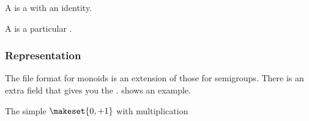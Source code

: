 
A \Monoid is a \Semigroup with an identity.


A \FiniteMonoid is a particular \FiniteSemigroup.


\subsubsection*{Representation}

The file format for monoids is an extension of those for semigroups.
There is an extra field  that gives you the .
 shows an example.

\begin{marginfigure}%
    \caption{The simple  $\makeset{0,+1}$ with multiplication}%
    \label{fig:monoid2}%
\end{marginfigure}%



